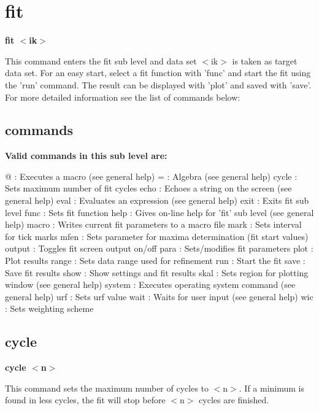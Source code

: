 \section{fit}
{\bf fit $ <$ik$> $ \par }
\par
\vspace{3pt}
This command enters the fit sub level and data set $ <$ik$> $ is taken 
as target data set. For an easy start, select a fit function 
with 'func' and start the fit using the 'run' command. The result 
can be displayed with 'plot' and saved with 'save'. For more 
detailed information see the list of commands below: 
\par
\subsection*{commands}
{\bf Valid commands in this sub level are: \par }
\par
\begin{MacVerbatim}
@      : Executes a macro (see general help)
=      : Algebra (see general help)
cycle  : Sets maximum number of fit cycles
echo   : Echoes a string on the screen (see general help)
eval   : Evaluates an expression  (see general help)
exit   : Exits fit sub level
func   : Sets fit function
help   : Gives on-line help for 'fit' sub level (see general help)
macro  : Writes current fit parameters to a macro file
mark   : Sets interval for tick marks
mfen   : Sets parameter for maxima determination (fit start values)
output : Toggles fit screen output on/off
para   : Sets/modifies fit parameters
plot   : Plot results
range  : Sets data range used for refinement
run    : Start the fit
save   : Save fit results
show   : Show settings and fit results
skal   : Sets region for plotting window (see general help)
system : Executes operating system command (see general help)
urf    : Sets urf value
wait   : Waits for user input (see general help)
wic    : Sets weighting scheme
\end{MacVerbatim}
\subsection*{cycle}
{\bf cycle $ <$n$> $ \par }
\par
\vspace{3pt}
This command sets the maximum number of cycles to $ <$n$> $. If a minimum 
is found in less cycles, the fit will stop before $ <$n$> $ cycles are 
finished. 
